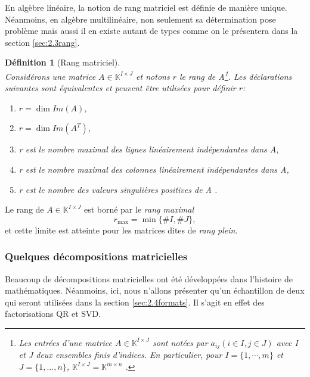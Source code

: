 \documentclass[11pt,a4paper,oneside]{book}
\newtheorem{defi}{Définition}[chapter]
\def\K{\mathbb K}
\begin{document}
En algèbre linéaire, la notion de rang matriciel est définie de manière unique. Néanmoins, en algèbre multilinéaire, non seulement sa détermination  pose problème mais aussi il en existe autant de types comme on le présentera dans la section \ref{sec:2.3rang}.

\begin{defi}[Rang matriciel]\label{defrang}
	\emph{\\}
	Considérons une matrice $A\in \K^{I\times J}$ et notons $ r$ le rang de A\footnote{Les entrées d'une matrice $A\in \K^{I\times J}$ sont notées par $ a_{ij}(i\in I, j\in J) $ avec I et J deux ensembles finis d'indices. En particulier, pour $ I=\{1,\cdots,m\} $ et $ J=\{1,\dots,n\} $, $ \K^{I\times J}=\K^{m\times n} $ \cite[p.21]{hackbusch2012tensor}.}. Les déclarations suivantes sont équivalentes et  peuvent être
	utilisées pour définir  $ r $:
	
	\begin{enumerate}
		\item[(a)]
		$ r=\dim Im(A) $,
		\item[(b)]
		$ r=\dim Im(A^{T}) $,
		\item[(c)]
		r est le nombre maximal des lignes linéairement indépendantes dans A,
		\item[(d)]
		r est le nombre maximal des colonnes linéairement indépendantes dans A,
		\item[(e)]
		r est le nombre des valeurs singulières positives de A \cite[p.24]{hackbusch2012tensor}.
	\end{enumerate}
\end{defi}
  Le rang de $ A\in \K^{I\times J} $ est borné par le \textit{rang maximal}
\begin{equation}
r_{\max}=\min\{\#I,\#J\},
\end{equation}
et cette limite est atteinte pour les matrices dites de \textit{rang plein}. 

\subsubsection{Quelques décompositions matricielles}\label{ssec:matrixdecomp}
Beaucoup de décompositions matricielles ont été développées dans l'histoire de mathématiques. Néanmoins, ici, nous n'allons présenter qu'un échantillon de deux qui seront utilisées dans la section \ref{sec:2.4formats}. Il s'agit en effet des factorisations QR et SVD. 
\end{document}
